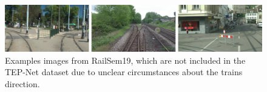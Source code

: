 \begin{figure}[H]
    \centering
    \includegraphics[width=\linewidth]{PICs/datasets/TEP_dataset/TEP-Net dataset bilder aussortiert.png}
    \caption{Examples images from RailSem19, which are not included in the \ac{TEP}-Net dataset due to unclear circumstances about the trains direction. \cite{tepNet2024}}
    \label{tep-net_aussortiert}
\end{figure}


\begin{figure}[H]
    \centering
    

\end{figure}
